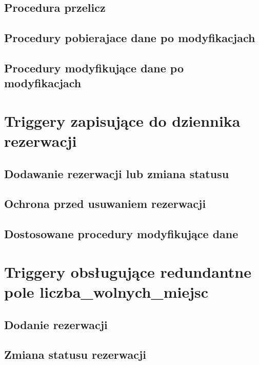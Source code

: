 \documentclass[12pt]{article}
\begin{document}
\subsection{Procedura przelicz}

\subsection{Procedury pobierajace dane po modyfikacjach}

\subsection{Procedury modyfikujące dane po modyfikacjach}




\section{Triggery zapisujące do dziennika rezerwacji}
\subsection{Dodawanie rezerwacji lub zmiana statusu}

\subsection{Ochrona przed usuwaniem rezerwacji}

\subsection{Dostosowane procedury modyfikujące dane}



\section{Triggery obsługujące redundantne pole liczba\_wolnych\_miejsc}
\subsection{Dodanie rezerwacji}

\subsection{Zmiana statusu rezerwacji}

\end{document}
